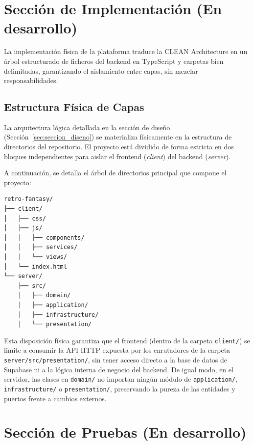 \section{Sección de Implementación (En desarrollo)}
\label{sec:seccion_implementacion}

La implementación física de la plataforma traduce la CLEAN Architecture en un árbol estructurado de ficheros del backend en TypeScript y carpetas bien delimitadas, garantizando el aislamiento entre capas, sin mezclar responsabilidades.

\subsection{Estructura Física de Capas}
La arquitectura lógica detallada en la sección de diseño (Sección~\ref{sec:seccion_diseno}) se materializa físicamente en la estructura de directorios del repositorio. El proyecto está dividido de forma estricta en dos bloques independientes para aislar el frontend (\textit{client}) del backend (\textit{server}).

A continuación, se detalla el árbol de directorios principal que compone el proyecto:

\begin{lstlisting}[language=bash, caption={Estructura de directorios física del repositorio de Retro Fantasy.}, label={lst:directory_tree}]
retro-fantasy/
├── client/                
│   ├── css/                
│   ├── js/                
│   │   ├── components/     
│   │   ├── services/      
│   │   └── views/         
│   └── index.html          
└── server/                 
    ├── src/
    │   ├── domain/        
    │   ├── application/   
    │   ├── infrastructure/ 
    │   └── presentation/   
\end{lstlisting}

Esta disposición física garantiza que el frontend (dentro de la carpeta \texttt{client/}) se limite a consumir la API HTTP expuesta por los enrutadores de la carpeta \texttt{server/src/presentation/}, sin tener acceso directo a la base de datos de Supabase ni a la lógica interna de negocio del backend. De igual modo, en el servidor, las clases en \texttt{domain/} no importan ningún módulo de \texttt{application/}, \texttt{infrastructure/} o \texttt{presentation/}, preservando la pureza de las entidades y puertos frente a cambios externos.


\section{Sección de Pruebas (En desarrollo)}
\label{sec:seccion_pruebas}


